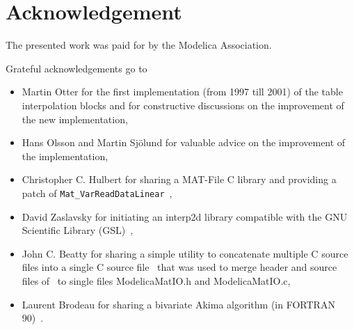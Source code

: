 \documentclass[11pt,a4paper,twocolumn]{article}
\begin{document}
\section{Acknowledgement}
The presented work was paid for by the Mod\-el\-ica Association.

Grateful acknowledgements go to
\begin{itemize}
\item Martin Otter for the first implementation (from 1997 till 2001) of the table interpolation blocks and for constructive discussions on the improvement of the new implementation,
\item Hans Olsson and Martin Sj\"olund for valuable advice on the improvement of the implementation,
\item Christopher C. Hulbert for sharing a MAT-File C library and providing a patch of \texttt{Mat\_Var\-Read\-Data\-Lin\-ear}~\cite{www:libmatio},
\item David Zaslavsky for initiating an interp2d library compatible with the GNU Scientific Library (GSL)~\cite{www:interp2d},
\item John C. Beatty for sharing a simple utility to concatenate multiple C source files into a single C source file~\cite{www:mergeCsource} that was used to merge header and source files of~\cite{www:libmatio} to single files Mod\-el\-ica\-MatIO.h and Mod\-el\-ica\-MatIO.c,
\item Laurent Brodeau for sharing a bivariate Akima algorithm (in FORTRAN 90)~\cite{www:sosie}.
\end{itemize}
\end{document}
